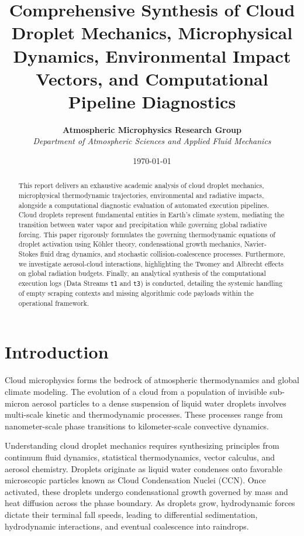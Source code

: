\documentclass[12pt]{article}
\title{\textbf{Comprehensive Synthesis of Cloud Droplet Mechanics, Microphysical Dynamics, Environmental Impact Vectors, and Computational Pipeline Diagnostics}}
\author{\textbf{Atmospheric Microphysics Research Group} \\
\textit{Department of Atmospheric Sciences and Applied Fluid Mechanics}}
\date{\today}
\begin{document}
\maketitle

\begin{abstract}
This report delivers an exhaustive academic analysis of cloud droplet mechanics, microphysical thermodynamic trajectories, environmental and radiative impacts, alongside a computational diagnostic evaluation of automated execution pipelines. Cloud droplets represent fundamental entities in Earth's climate system, mediating the transition between water vapor and precipitation while governing global radiative forcing. This paper rigorously formulates the governing thermodynamic equations of droplet activation using Köhler theory, condensational growth mechanics, Navier-Stokes fluid drag dynamics, and stochastic collision-coalescence processes. Furthermore, we investigate aerosol-cloud interactions, highlighting the Twomey and Albrecht effects on global radiation budgets. Finally, an analytical synthesis of the computational execution logs (Data Streams \texttt{t1} and \texttt{t3}) is conducted, detailing the systemic handling of empty scraping contexts and missing algorithmic code payloads within the operational framework.
\end{abstract}

\section{Introduction}
Cloud microphysics forms the bedrock of atmospheric thermodynamics and global climate modeling. The evolution of a cloud from a population of invisible sub-micron aerosol particles to a dense suspension of liquid water droplets involves multi-scale kinetic and thermodynamic processes. These processes range from nanometer-scale phase transitions to kilometer-scale convective dynamics.

Understanding cloud droplet mechanics requires synthesizing principles from continuum fluid dynamics, statistical thermodynamics, vector calculus, and aerosol chemistry. Droplets originate as liquid water condenses onto favorable microscopic particles known as Cloud Condensation Nuclei (CCN). Once activated, these droplets undergo condensational growth governed by mass and heat diffusion across the phase boundary. As droplets grow, hydrodynamic forces dictate their terminal fall speeds, leading to differential sedimentation, hydrodynamic interactions, and eventual coalescence into raindrops.
\end{document}
